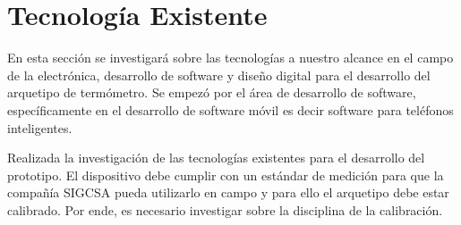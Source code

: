 \section{Tecnología Existente}

\par \noindent
En esta sección se investigará sobre las tecnologías a nuestro alcance en el campo de la electrónica, desarrollo de software y diseño digital para el desarrollo del arquetipo de termómetro. Se empezó por el área de desarrollo de software, específicamente en el desarrollo de software móvil es decir software para teléfonos inteligentes.











\par \noindent
Realizada la investigación de las tecnologías existentes para el desarrollo del prototipo. El dispositivo debe cumplir con un estándar de medición para que la compañía SIGCSA pueda utilizarlo en campo y para ello el arquetipo debe estar calibrado. Por ende, es necesario investigar sobre la disciplina de la calibración.
